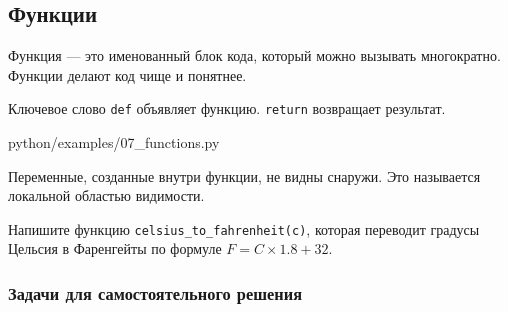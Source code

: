 \subsection{Функции}

Функция — это именованный блок кода, который можно вызывать многократно. Функции делают код чище и понятнее.

Ключевое слово \texttt{def} объявляет функцию. \texttt{return} возвращает результат.

\begin{codefile}[python]{python/examples/07_functions.py}
\end{codefile}

\begin{infobox}
Переменные, созданные внутри функции, не видны снаружи. Это называется локальной областью видимости.
\end{infobox}

\begin{taskbox}[Конвертер]
Напишите функцию \texttt{celsius\_to\_fahrenheit(c)}, которая переводит градусы Цельсия в Фаренгейты по формуле $F = C \times 1.8 + 32$.
\end{taskbox}

\subsubsection*{Задачи для самостоятельного решения}

